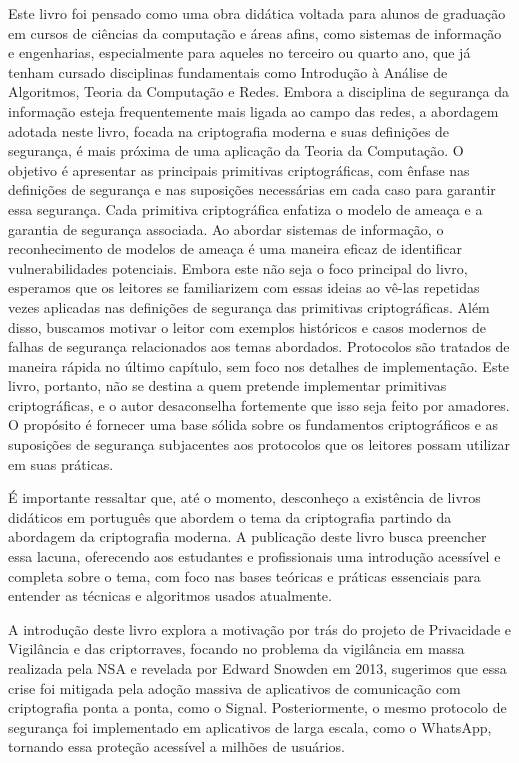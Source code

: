 Este livro foi pensado como uma obra didática voltada para alunos de graduação em cursos de ciências da computação e áreas afins, como sistemas de informação e engenharias, especialmente para aqueles no terceiro ou quarto ano, que já tenham cursado disciplinas fundamentais como Introdução à Análise de Algoritmos, Teoria da Computação e Redes.
Embora a disciplina de segurança da informação esteja frequentemente mais ligada ao campo das redes, a abordagem adotada neste livro, focada na criptografia moderna e suas definições de segurança, é mais próxima de uma aplicação da Teoria da Computação.
O objetivo é apresentar as principais primitivas criptográficas, com ênfase nas definições de segurança e nas suposições necessárias em cada caso para garantir essa segurança.
Cada primitiva criptográfica enfatiza o modelo de ameaça e a garantia de segurança associada.
Ao abordar sistemas de informação, o reconhecimento de modelos de ameaça é uma maneira eficaz de identificar vulnerabilidades potenciais.
Embora este não seja o foco principal do livro, esperamos que os leitores se familiarizem com essas ideias ao vê-las repetidas vezes aplicadas nas definições de segurança das primitivas criptográficas.
Além disso, buscamos motivar o leitor com exemplos históricos e casos modernos de falhas de segurança relacionados aos temas abordados.
Protocolos são tratados de maneira rápida no último capítulo, sem foco nos detalhes de implementação.
Este livro, portanto, não se destina a quem pretende implementar primitivas criptográficas, e o autor desaconselha fortemente que isso seja feito por amadores.
O propósito é fornecer uma base sólida sobre os fundamentos criptográficos e as suposições de segurança subjacentes aos protocolos que os leitores possam utilizar em suas práticas.

É importante ressaltar que, até o momento, desconheço a existência de livros didáticos em português que abordem o tema da criptografia partindo da abordagem da criptografia moderna.
A publicação deste livro busca preencher essa lacuna, oferecendo aos estudantes e profissionais uma introdução acessível e completa sobre o tema, com foco nas bases teóricas e práticas essenciais para entender as técnicas e algoritmos usados atualmente.

A introdução deste livro explora a motivação por trás do projeto de Privacidade e Vigilância e das criptorraves, focando no problema da vigilância em massa realizada pela NSA e revelada por Edward Snowden em 2013, sugerimos que essa crise foi mitigada pela adoção massiva de aplicativos de comunicação com criptografia ponta a ponta, como o Signal.
Posteriormente, o mesmo protocolo de segurança foi implementado em aplicativos de larga escala, como o WhatsApp, tornando essa proteção acessível a milhões de usuários.

